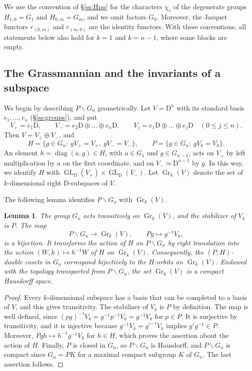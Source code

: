 \documentclass[11pt]{amsart}
\numberwithin{equation}{section}
\theoremstyle{plain}
\newtheorem{lemma}[theorem]{Lemma}
\theoremstyle{definition}
\theoremstyle{remark}
\DeclareMathOperator{\GL}{GL}
\DeclareMathOperator{\Gr}{Gr}
\DeclareMathOperator{\diag}{diag}
\begin{document}
We use the convention of \S\ref{ss:Hpq} for the characters $\chi_c$ of the degenerate groups $H_{1,0}=G_1$ and $H_{0,m}=G_m$, and we omit factors $G_0$. Moreover, the Jacquet functors $r_{(0,m)}$ and $r_{(m,0)}$ are the identity functors. With these conventions, all statements below also hold for $k=1$ and $k=n-1$, where some blocks are empty. 

\subsection{The Grassmannian and the invariants of a subspace}\label{ss:grassmannian}

We begin by describing $P\backslash G_n$ geometrically. Let $V=\mathrm{D}^n$ with its standard basis $e_1,\dots,e_n$ (\S\ref{ss:groups}), and put
$$
V_+=e_1\mathrm{D},\qquad V_-=e_2\mathrm{D}\oplus\dots\oplus e_n\mathrm{D},\qquad V_j=e_1\mathrm{D}\oplus\dots\oplus e_j\mathrm{D}\quad(0\le j\le n).
$$
Then $V=V_+\oplus V_-$, and
$$
H=\{g\in G_n:\ gV_+=V_+,\ gV_-=V_-\},\qquad P=\{g\in G_n:\ gV_k=V_k\}.
$$
An element $h=\diag(a,g)\in H$, with $a\in G_1$ and $g\in G_{n-1}$, acts on $V_+$ by left multiplication by $a$ on the first coordinate, and on $V_-\simeq \mathrm{D}^{n-1}$ by $g$. In this way, we identify $H$ with $\GL_{\mathrm{D}}(V_+)\times\GL_{\mathrm{D}}(V_-)$. Let $\Gr_k(V)$ denote the set of $k$-dimensional right $\mathrm{D}$-subspaces of $V$.

The following lemma identifies $P\backslash G_n$ with $\Gr_k(V)$.

\begin{lemma}\label{lem:grass}
	The group $G_n$ acts transitively on $\Gr_k(V)$, and the stabilizer of $V_k$ is $P$. The map
	$$
	P\backslash G_n\longrightarrow\Gr_k(V),\qquad Pg\longmapsto g^{-1}V_k,
	$$
	is a bijection. It transforms the action of $H$ on $P\backslash G_n$ by right translation into the action $(W,h)\mapsto h^{-1}W$ of $H$ on $\Gr_k(V)$. Consequently, the $(P,H)$-double cosets in $G_n$ correspond bijectively to the $H$-orbits on $\Gr_k(V)$. Endowed with the topology transported from $P\backslash G_n$, the set $\Gr_k(V)$ is a compact Hausdorff space.
\end{lemma}

\begin{proof}
	Every $k$-dimensional subspace has a basis that can be completed to a basis of $V$, and this gives transitivity. The stabilizer of $V_k$ is $P$ by definition. The map is well defined, since $(pg)^{-1}V_k=g^{-1}p^{-1}V_k=g^{-1}V_k$ for $p\in P$. It is surjective by transitivity, and it is injective because $g^{-1}V_k=g'^{-1}V_k$ implies $g'g^{-1}\in P$. Moreover, $Pgh\mapsto h^{-1}g^{-1}V_k$ for $h\in H$, which proves the assertion about the action of $H$. Finally, $P$ is closed in $G_n$, so $P\backslash G_n$ is Hausdorff, and $P\backslash G_n$ is compact since $G_n=PK$ for a maximal compact subgroup $K$ of $G_n$. The last assertion follows.
\end{proof}
\end{document}
